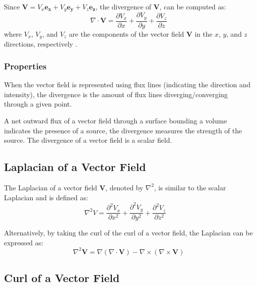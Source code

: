 Since \(\mathbf{V} = V_{x} \mathbf{e_x} + V_{y} \mathbf{e_y} + V_{z} 
\mathbf{e_z}\), the divergence of \(\mathbf{V}\), can be computed as:
\begin{equation}
\nabla \cdot \mathbf{V} = \frac{\partial V_{x}}{\partial x} + \frac{\partial 
V_{y}}{\partial y} + \frac{\partial V_{z}}{\partial z}
\end{equation}
where \(V_{x}\), \(V_{y}\), and \(V_{z}\) are the components of the vector field 
\(\mathbf{V}\) in the \(x\), \(y\), and \(z\) directions, respectively 
\cite{math-book}.

\subsubsection{Properties}
When the vector field is represented using flux lines (indicating the direction 
and intensity), the divergence is the amount of flux lines diverging/converging 
through a given point.

A net outward flux of a vector field through a surface bounding a volume 
indicates the presence of a source, the divergence measures the strength of the 
source. The divergence of a vector field is a scalar field. 

\subsection{Laplacian of a Vector Field}
The Laplacian of a vector field $\mathbf{V}$, denoted by $\nabla^2$, is similar 
to the scalar Laplacian and is defined as:
\begin{equation}
\nabla^2 V = \frac{\partial^2 V_x}{\partial x^2} + \frac{\partial^2 V_y}{\partial 
y^2} + \frac{\partial^2 V_z}{\partial z^2} \quad
\end{equation}

Alternatively, by taking the curl of the curl of a vector field, the Laplacian 
can be expressed as:
\begin{equation}
   \nabla^2 \mathbf{V} = \nabla (\nabla \cdot \mathbf{V}) - \nabla \times 
   (\nabla \times \mathbf{V})
   \label{eq:laplacian}
\end{equation}

\subsection{Curl of a Vector Field}
